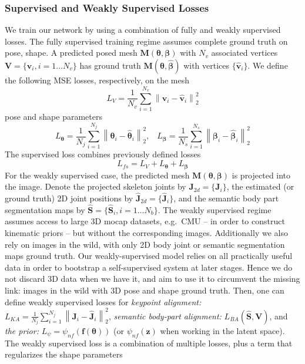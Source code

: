\documentclass[runningheads]{llncs}
\newcommand{\thetab}{\bm{\theta}}
\newcommand{\betab}{\bm{\beta}}
\newcommand{\zz}{\mathbf{z}}
\newcommand{\ff}{\mathbf{f}}
\newcommand{\eg}{e.g.\ }
\begin{document}
\subsubsection{Supervised and Weakly Supervised Losses}\label{sec:loses}
We train our network by using a combination of fully and weakly supervised losses. The fully supervised training regime assumes complete ground truth on pose, shape. A predicted posed mesh $\mathbf{M}(\thetab, \betab)$ with $N_{v}$ associated vertices $\mathbf{V}=\{\mathbf{v}_{i},i=1\ldots N_v\}$ 
has ground truth $\mathbf{M}(\widehat{\thetab}, \widehat{\betab})$ with vertices $\{\widehat{\mathbf{v}}_{i}\}$.
We define the following MSE losses, respectively, on the mesh 
\begin{equation}
L_{V} = \frac{1}{N_{v}} \sum_{i=1}^{N_v}\left\|\mathbf{v}_{i} - \widehat{\mathbf{v}}_{i}\right\|_{2}^{2}
\end{equation}
pose and shape parameters
\begin{equation}
L_{\thetab} = \frac{1}{N_{j}} \sum_{i=1}^{N_j}\left\|\thetab_{i} - \widehat{\thetab}_{i}\right\|_{2}^{2}, \;\;\;
L_{\betab} = \frac{1}{N_{s}} \sum_{i=1}^{N_{s}}\left\|\betab_{i} - \widehat{\betab}_{i}\right\|_{2}^{2}
\end{equation}
The supervised loss combines previously defined losses
\begin{equation}
L_{fs} = L_{V} + L_{\thetab} + L_{\betab}
\end{equation}
For the weakly supervised case, the predicted mesh $\mathbf{M}(\thetab, \betab)$ is projected into the image. Denote the projected skeleton joints by $\mathbf{J}_{2d} = \{\mathbf{J}_i\}$,
the estimated (or ground truth) 2D joint positions by $\widehat{\mathbf{J}}_{2d} = \{\widehat{\mathbf{J}}_i\}$, and the semantic body part segmentation maps by $\widehat{\mathbf{S}}=\{\widehat{\mathbf{S}}_i,i=1\ldots N_{b}\}$. The weakly supervised regime assumes access to large 3D mocap datasets, \eg CMU -- in order to construct kinematic priors -- but without the corresponding images. Additionally we also rely on images in the wild, with only 2D body joint or semantic segmentation maps ground truth. Our weakly-supervised model relies on all practically useful data in order to bootstrap a self-supervised system at later stages. Hence we do not discard 3D data when we have it, and aim to use it to circumvent the missing link: images in the wild with 3D pose and shape ground truth. 
Then, one can define weakly supervised losses for \emph{keypoint alignment:} $L_{KA} = \frac{1}{N_{j}} \sum_{i=1}^{N_j}\left\|\mathbf{J}_{i} - \widehat{\mathbf{J}}_{i}\right\|_{2}^{2}$, \emph{semantic body-part alignment:} $L_{BA}\left(\widehat{\mathbf{S}}, \mathbf{V}\right)$, and \emph{the prior:} $L_{\psi} = \psi_{nf}\left(\ff(\thetab)\right)$ (or $\psi_{nf}\left(\zz\right)$ when working in the latent space). The weakly supervised loss is a combination of multiple losses, plus a term that regularizes the shape parameters
\end{document}
